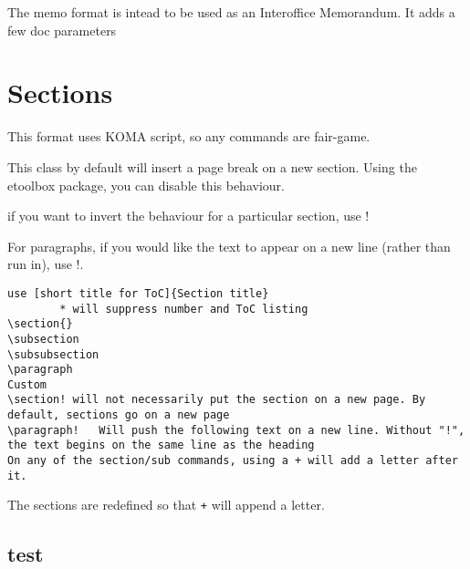 \documentclass{corpboreport}
\newcommand{\cmd}[1]{\texttt{\detokenize{#1}}}
\begin{document}
The memo format is intead to be used as an Interoffice Memorandum. It adds a few doc parameters

\section{Sections}

This format uses KOMA script, so any commands are fair-game.

This class by default will insert a page break on a new section.
Using the etoolbox package, you can disable this behaviour.

if you want to invert the behaviour for a particular section, use !

For paragraphs, if you would like the text to appear on a new line (rather than run in), use !.

\lstset{language=tex}
\begin{lstlisting}
use [short title for ToC]{Section title}
		* will suppress number and ToC listing
\section{}
\subsection
\subsubsection
\paragraph
Custom
\section! will not necessarily put the section on a new page. By default, sections go on a new page
\paragraph!   Will push the following text on a new line. Without "!", the text begins on the same line as the heading
On any of the section/sub commands, using a + will add a letter after it.
\end{lstlisting}

The sections are redefined so that \texttt{+} will append a letter. \cmd{\reset[sub]sectionletter}

	\subsection{test}
\end{document}
